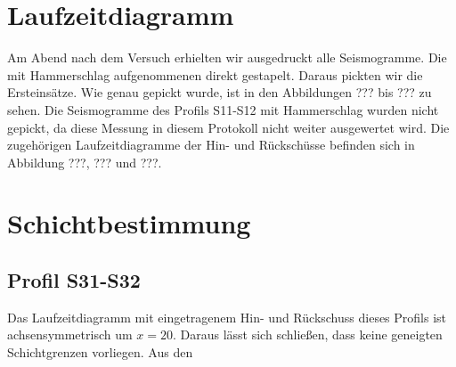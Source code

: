 \section{Laufzeitdiagramm}

Am Abend nach dem Versuch erhielten wir ausgedruckt alle Seismogramme. Die mit Hammerschlag aufgenommenen direkt gestapelt. Daraus pickten wir die Ersteinsätze. Wie genau gepickt wurde, ist in den Abbildungen ??? bis ??? zu sehen. Die Seismogramme des Profils S11-S12 mit Hammerschlag wurden nicht gepickt, da diese Messung in diesem Protokoll nicht weiter ausgewertet wird. Die zugehörigen Laufzeitdiagramme der Hin- und Rückschüsse befinden sich in Abbildung ???, ??? und ???.

\section{Schichtbestimmung}

\subsection{Profil S31-S32}

Das Laufzeitdiagramm mit eingetragenem Hin- und Rückschuss dieses Profils ist achsensymmetrisch um $x=20$. Daraus lässt sich schließen, dass keine geneigten Schichtgrenzen vorliegen. Aus den 


